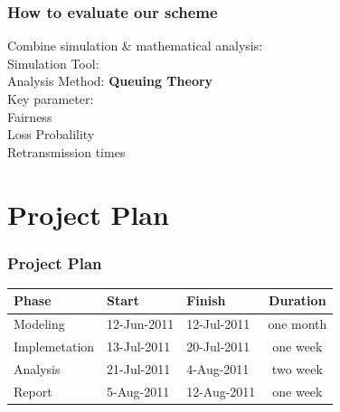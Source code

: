 \documentclass{beamer}
\begin{document}
  \frame
  {
    \frametitle{How to evaluate our scheme}
    Combine simulation \& mathematical analysis: \\
    \hspace{5mm}  Simulation Tool: \hspace{1.3mm}{\bf Opnet} \\
    \hspace{5mm}  Analysis Method: {\bf Queuing Theory} \\

    \vspace{10mm}
    Key parameter: \\
    \hspace{5mm}  Fairness \\
    \hspace{5mm}  Loss Probalility \\
    \hspace{5mm}  Retransmission times
  }

  \section{Project Plan}

  \frame
  {
    \frametitle{Project Plan}
    \begin{center}
    \begin{tabular}{|l|l|l|c|}
        \hline
        Phase & Start & Finish &Duration \\
        \hline
        Modeling & 12-Jun-2011 & 12-Jul-2011 & one month \\
        \hline
        Implemetation & 13-Jul-2011 & 20-Jul-2011 & one week \\
        \hline
        Analysis & 21-Jul-2011  & 4-Aug-2011 & two week \\
        \hline
        Report & 5-Aug-2011 & 12-Aug-2011 & one week \\
        \hline
    \end{tabular}
    \end{center}
  }
\end{document}
